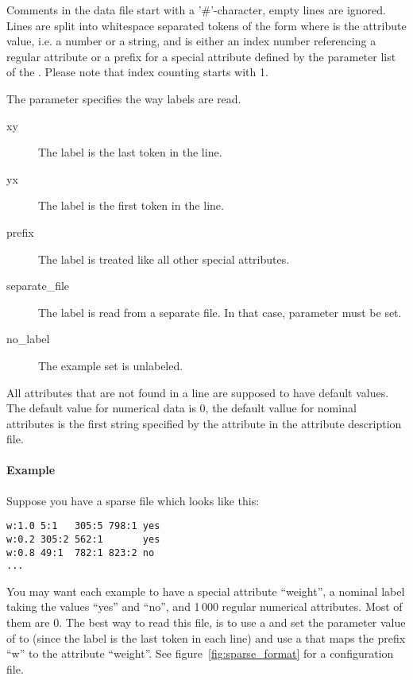 {Comments in the data file start with a '\#'-character, empty lines are
ignored. Lines are split into whitespace separated tokens of the form
 where  is the attribute value,
i.e. a number or a string, and  is either an index number
referencing a regular attribute or a prefix for a special attribute
defined by the parameter list  of the
. Please note that index counting starts with 1.


The  parameter  specifies
the way labels are read.
\begin{description}
\item[xy] The label is the last token in the line.
\item[yx] The label is the first token in the line.
\item[prefix] The label is treated like all other special attributes.
\item[separate\_file] The label is read from a separate file. In that case,
  parameter  must be set.
\item[no\_label] The example set is unlabeled.
\end{description}

All attributes that are not found in a line are supposed to have default
values. The default value for numerical data is 0, the default vallue for nominal
attributes is the first string specified by the  attribute in the
attribute description file.

\paragraph{Example} Suppose you have a sparse file which looks like
this:
\begin{verbatim}
w:1.0 5:1   305:5 798:1 yes
w:0.2 305:2 562:1       yes
w:0.8 49:1  782:1 823:2 no
...
\end{verbatim}
You may want each example to have a special attribute ``weight'', a
nominal label taking the values ``yes'' and ``no'', and 1\,000 regular
numerical attributes. Most of them are 0. The best way to read this
file, is to use a  and set the parameter
value of  to  (since the label is the last
token in each line) and use a  that maps the prefix
``w'' to the attribute ``weight''. See figure~\ref{fig:sparse_format}
for a configuration file.



}
